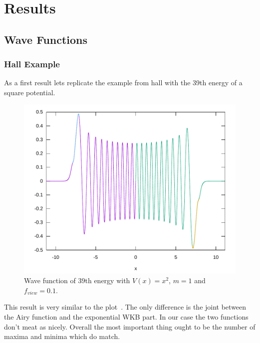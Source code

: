 \documentclass[11pt,DIV=10,final]{scrreprt} %
\begin{document}
\chapter{Results}
\section{Wave Functions}
\subsection{Hall Example}\label{sec:resutl:hall}
As a first result lets replicate the example from hall with the 39th energy of a square potential.
\begin{figure}[H]
  \centering
  \includegraphics[width=\textwidth]{plots/square-39.pdf}
  \caption{Wave function of 39th energy with $V(x) = x^{2}$, $m = 1$ and $f_{view}=0.1$.}
\end{figure}
This result is very similar to the plot~\cite[fig. 15.5]{hall2013quantum}. The only difference is the joint between the Airy function and the exponential WKB part. In our case the two functions don't
meat as nicely.
Overall the most important thing ought to be the number of maxima and minima which do match.
\end{document}

